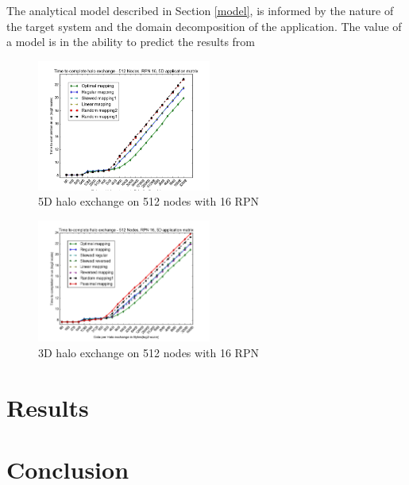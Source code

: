 \documentclass{acm_proc_article-sp}
\begin{document}
The analytical model described in Section \ref{model}, is informed by the nature of the target system
and the domain decomposition of the application. The value of a model is in the ability to predict the
results from
%


\label{sect:5D Halo plot}
\begin{figure}
  \center
  \includegraphics[width=0.51\textwidth]{5D_512_most_mappings_2.png}
  \caption{5D halo exchange on 512 nodes with 16 RPN}
    \label{fig:5D halo exchange on 512 nodes with 16 RPN}
\end{figure}


\label{sect:3D Halo plot}
\begin{figure}
  \center
  \includegraphics[width=0.51\textwidth]{3D_512_all_mappings.png}
  \caption{3D halo exchange on 512 nodes with 16 RPN}
    \label{fig:3D halo exchange on 512 nodes with 16 RPN}
\end{figure}




\section{Results}

\section{Conclusion}




\end{document}
